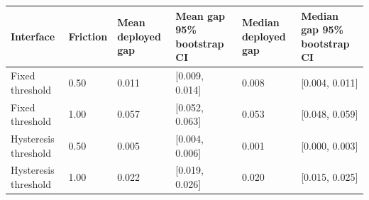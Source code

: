 \begin{tabular}{llllll}
\toprule
Interface & Friction & Mean deployed gap & Mean gap 95\% bootstrap CI & Median deployed gap & Median gap 95\% bootstrap CI \\
\midrule
Fixed threshold & 0.50 & 0.011 & [0.009, 0.014] & 0.008 & [0.004, 0.011] \\
Fixed threshold & 1.00 & 0.057 & [0.052, 0.063] & 0.053 & [0.048, 0.059] \\
Hysteresis threshold & 0.50 & 0.005 & [0.004, 0.006] & 0.001 & [0.000, 0.003] \\
Hysteresis threshold & 1.00 & 0.022 & [0.019, 0.026] & 0.020 & [0.015, 0.025] \\
\bottomrule
\end{tabular}
